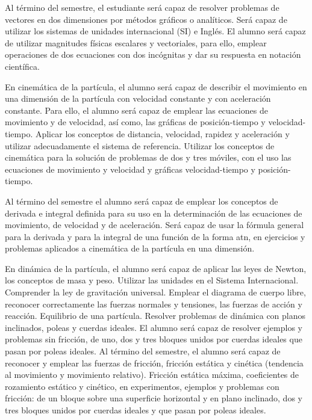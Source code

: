 \begin{syllabus}
\begin{goals}
\item Al término del semestre, el estudiante será capaz de resolver problemas de vectores en dos dimensiones por métodos gráficos o analíticos. Será capaz de utilizar los sistemas de unidades internacional (SI) e Inglés. El alumno será capaz de utilizar magnitudes físicas escalares y vectoriales, para ello, emplear operaciones de dos ecuaciones con dos incógnitas y dar su respuesta en notación científica.
\item En cinemática de la partícula, el alumno será capaz de describir el movimiento en una dimensión de la partícula con velocidad constante y con aceleración constante. Para ello, el alumno será capaz de emplear las ecuaciones de movimiento y de velocidad, así como, las gráficas de posición-tiempo y velocidad-tiempo. Aplicar los conceptos de distancia, velocidad, rapidez y aceleración y utilizar adecuadamente el sistema de referencia. Utilizar los conceptos de cinemática para la solución de problemas de dos y tres móviles, con el uso las ecuaciones de movimiento y velocidad y gráficas velocidad-tiempo y posición-tiempo.
\item Al término del semestre el alumno será capaz de emplear los conceptos de derivada e integral definida para su uso en la determinación de las ecuaciones de movimiento, de velocidad y de aceleración. Será capaz de usar la fórmula general para la derivada y para la integral de una función de la forma atn, en ejercicios y problemas aplicados a cinemática de la partícula en una dimensión.
\item En dinámica de la partícula, el alumno será capaz de aplicar las leyes de Newton, los conceptos de masa y peso. Utilizar las unidades en el Sistema Internacional. Comprender la ley de gravitación universal. Emplear el diagrama de cuerpo libre, reconocer correctamente las fuerzas normales y tensiones, las fuerzas de acción y reacción. Equilibrio de una partícula. Resolver problemas de dinámica con planos inclinados, poleas y cuerdas ideales. El alumno será capaz de resolver ejemplos y problemas sin fricción, de uno, dos y tres bloques unidos por cuerdas ideales que pasan por poleas ideales. Al término del semestre, el alumno será capaz de reconocer y emplear las fuerzas de fricción, fricción estática y cinética (tendencia al movimiento y movimiento relativo). Fricción estática máxima, coeficientes de rozamiento estático y cinético, en experimentos, ejemplos y problemas con fricción: de un bloque sobre una superficie horizontal y en plano inclinado, dos y tres bloques unidos por cuerdas ideales y que pasan por poleas ideales.
\end{goals}


\end{syllabus}

